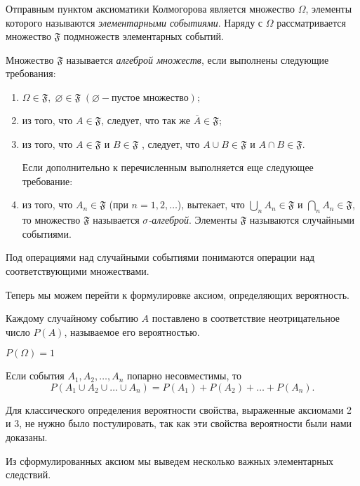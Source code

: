 Отправным пунктом аксиоматики Колмогорова является множество $\Omega$, элементы которого называются \textit{элементарными событиями}. Наряду с $\Omega$ рассматривается множество $\mathfrak{F}$ подмножеств элементарных событий. 
\begin{defn} Множество $\mathfrak{F}$ называется \textit{алгеброй множеств}, если выполнены следующие требования:
\begin{enumerate}
\item
$\Omega \in \mathfrak{F},\; \varnothing \in \mathfrak{F} \;(\varnothing - \text{пустое множество});$
\item
из того, что $A \in \mathfrak{F}$, следует, что так же $\overline{A} \in \mathfrak{F}$;
\item
из того, что  $A \in \mathfrak{F}$ и $B \in \mathfrak{F}$ , следует, что $A \cup B \in \mathfrak{F}$ и $A \cap B \in \mathfrak{F}$.

Если дополнительно к перечисленным выполняется еще следующее требование:
\item
из того, что $A_n \in \mathfrak{F}$ (при $n = 1,2, \ldots$), вытекает, что $\bigcup\limits_{n} A_n \in \mathfrak{F}$ и $\bigcap\limits_{n} A_n \in \mathfrak{F}$, то множество $\mathfrak{F}$ называется \textit{$\sigma$-алгеброй}. Элементы $\mathfrak{F}$ называются случайными событиями.
\end{enumerate}
\end{defn}

Под операциями над случайными событиями понимаются операции над соответствующими множествами. 

Теперь мы можем перейти к формулировке аксиом, определяющих вероятность.
\begin{axiome} 
Каждому случайному событию $A$ поставлено в соответствие неотрицательное число $P(A)$, называемое его вероятностью.
\end{axiome}
\begin{axiome} 
$P(\Omega) = 1$
\end{axiome}
\begin{axiome}[сложения] 
Если события $A_1,A_2, \ldots, A_n$ попарно несовместимы, то 
$$
P(A_1 \cup A_2 \cup \ldots \cup A_n) = P(A_1) + P(A_2) + \ldots + P(A_n).
$$
\end{axiome}
Для классического определения вероятности свойства, выраженные аксиомами 2 и 3, не нужно было постулировать, так как эти свойства вероятности были нами доказаны.

Из сформулированных аксиом мы выведем несколько важных элементарных следствий.

